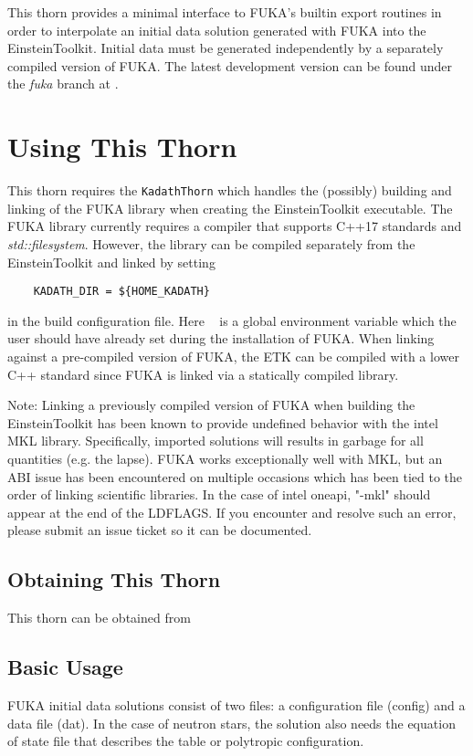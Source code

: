 This thorn provides a minimal interface to FUKA's builtin export routines in order to
interpolate an initial data solution generated with FUKA
into the EinsteinToolkit.  Initial data must be generated independently by a separately compiled
version of FUKA.  The latest development version can be found under the \textit{fuka} branch at \cite{fukacodes}.


\section{Using This Thorn}
This thorn requires the \texttt{KadathThorn} which handles the (possibly) building and linking of the FUKA library when creating
the EinsteinToolkit executable.  The FUKA library currently requires a compiler that supports C++17 standards and \textit{std::filesystem}.
However, the library can be compiled separately from the EinsteinToolkit and linked by setting 
\begin{verbatim}
    KADATH_DIR = ${HOME_KADATH}    
\end{verbatim}
in the build configuration file.  Here \hk~ is a global environment variable which the user should have already set during
the installation of FUKA.  When linking against a pre-compiled version of FUKA, the ETK can be compiled with a lower C++ standard since FUKA
is linked via a statically compiled library.

Note: Linking a previously compiled version of FUKA when building the EinsteinToolkit has been known to provide undefined behavior with
the intel MKL library.  Specifically, imported solutions will results in garbage for all quantities (e.g. the lapse).
FUKA works exceptionally well with MKL, but an ABI issue has been encountered on multiple occasions which has been
tied to the order of linking scientific libraries.  In the case of intel oneapi, "-mkl" should appear at the end of the LDFLAGS. If you
encounter and resolve such an error, please submit an issue ticket so it can be documented.

\subsection{Obtaining This Thorn}
This thorn can be obtained from \cite{fukaws}

\subsection{Basic Usage}
FUKA initial data solutions consist of two files: a configuration file (config) and a data file (dat).  In the case of neutron stars,
the solution also needs the equation of state file that describes the table or polytropic configuration.

